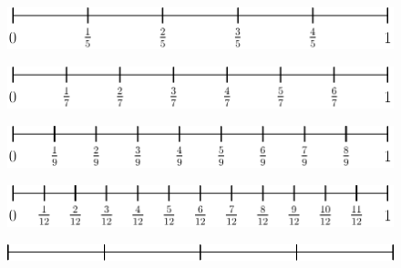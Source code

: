 \begin{figure}
	\centering
	\includegraphics[]{5del}
\end{figure}\vspace{40pt}

\begin{figure}
	\centering
	\includegraphics[]{7del}
\end{figure}\vspace{40pt}

\begin{figure}
	\centering
	\includegraphics[]{9del}
\end{figure}\vspace{40pt}
\begin{figure}
	\centering
	\includegraphics[]{12del}
\end{figure} \vspace{40pt}
\begin{figure}
	\centering
	\includegraphics[]{4delb}
\end{figure} 

